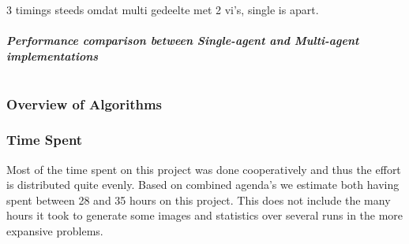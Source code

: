 \documentclass[10pt,a4paper]{article}
\begin{document}
3 timings steeds omdat multi gedeelte met 2 vi's, single is apart.

\subsubsection*{Performance comparison between Single-agent and Multi-agent implementations}





\part{}


\section{Overview of Algorithms}


\section{Time Spent}
Most of the time spent on this project was done cooperatively and thus the effort is distributed quite evenly.
Based on combined agenda's we estimate both having spent between 28 and 35 hours on this project. 
This does not include the many hours it took to generate some images and statistics over several runs in the more expansive problems.
\end{document}
